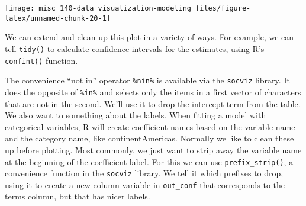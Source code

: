 \documentclass[]{book}
\newenvironment{Shaded}{\begin{snugshade}}{\end{snugshade}}
\newcommand{\CommentTok}[1]{\textcolor[rgb]{0.56,0.35,0.01}{\textit{#1}}}
\newcommand{\DataTypeTok}[1]{\textcolor[rgb]{0.13,0.29,0.53}{#1}}
\newcommand{\KeywordTok}[1]{\textcolor[rgb]{0.13,0.29,0.53}{\textbf{#1}}}
\newcommand{\NormalTok}[1]{#1}
\newcommand{\OperatorTok}[1]{\textcolor[rgb]{0.81,0.36,0.00}{\textbf{#1}}}
\newcommand{\OtherTok}[1]{\textcolor[rgb]{0.56,0.35,0.01}{#1}}
\newcommand{\StringTok}[1]{\textcolor[rgb]{0.31,0.60,0.02}{#1}}
\begin{document}
\begin{center}\texttt{[image: misc\_140-data\_visualization-modeling\_files/figure-latex/unnamed-chunk-20-1]} \end{center}

We can extend and clean up this plot in a variety of ways. For example, we can tell \texttt{tidy()} to calculate confidence intervals for the estimates, using R's \texttt{confint()} function.

\begin{Shaded}
\end{Shaded}

The convenience ``not in'' operator \texttt{\%nin\%} is available via the \texttt{socviz} library. It does the opposite of \texttt{\%in\%} and selects only the items in a first vector of characters that are not in the second. We'll use it to drop the intercept term from the table. We also want to something about the labels. When fitting a model with categorical variables, R will create coefficient names based on the variable name and the category name, like continentAmericas. Normally we like to clean these up before plotting. Most commonly, we just want to strip away the variable name at the beginning of the coefficient label. For this we can use \texttt{prefix\_strip()}, a convenience function in the \texttt{socviz} library. We tell it which prefixes to drop, using it to create a new column variable in \texttt{out\_conf} that corresponds to the terms column, but that has nicer labels.\\
\end{document}

